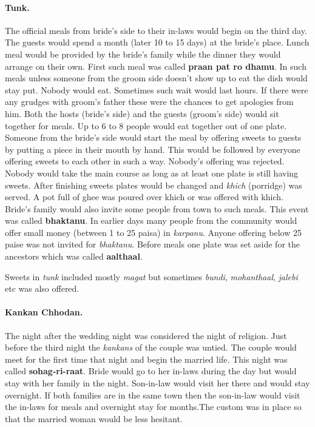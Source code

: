 \paragraph{Tunk.} The official meals from bride's side to their in-laws would
begin on the third day. The guests would spend a month (later 10 to 15 days) at
the bride's place. Lunch meal would be provided by the bride's family while the
dinner they would arrange on their own. First such meal was called
\textbf{praan pat ro dhamu}. In such meals unless someone from the groom side
doesn't show up to eat the dish would stay put. Nobody would eat. Sometimes
such wait would last hours. If there were any grudges with groom's father these
were the chances to get apologies from him. Both the hosts (bride's side) and
the guests (groom's side) would sit together for meals. Up to 6 to 8 people
would eat together out of one plate. Someone from the bride's side would start
the meal by offering sweets to guests by putting a piece in their mouth by
hand. This would be followed by everyone offering sweets to each other in such
a way. Nobody's offering was rejected. Nobody would take the main course as
long as at least one plate is still having sweets. After finishing sweets
plates would be changed and \textit{khich} (porridge) was served. A pot full of
ghee was poured over khich or was offered with khich. Bride's family would also
invite some people from town to such meals. This event was called \textbf{bhaktanu}.
In earlier days many people from the community would offer small money (between
1 to 25 paisa) in \textit{karpanu}. Anyone offering below 25 paise was
not invited for \textit{bhaktanu}. Before meals one plate was set aside for the
ancestors which was called \textbf{aalthaal}.

Sweets in \textit{tunk} included mostly \textit{magat} but sometimes
\textit{bundi}, \textit{mohanthaal}, \textit{jalebi} etc was also offered.

\paragraph{Kankan Chhodan.} The night after the wedding night was considered
the night of religion. Just before the third night the \textit{kankans} of the
couple was untied. The couple would meet for the first time that night and
begin the married life. This night was called \textbf{sohag-ri-raat}. Bride
would go to her in-laws during the day but would stay with her family in the
night. Son-in-law would visit her there and would stay overnight. If both
families are in the same town then the son-in-law would visit the in-laws for
meals and overnight stay for months.The custom was in place so that the married
woman would be less hesitant. 

